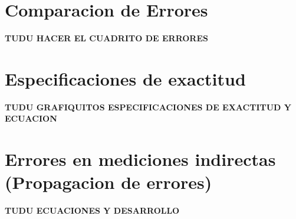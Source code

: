 \section{Comparacion de Errores}
\textbf{TUDU HACER EL CUADRITO DE ERRORES}


\section{Especificaciones de exactitud}
\textbf{TUDU GRAFIQUITOS ESPECIFICACIONES DE EXACTITUD Y ECUACION}


\section{Errores en mediciones indirectas (Propagacion de errores)}
\textbf{TUDU ECUACIONES Y DESARROLLO}
